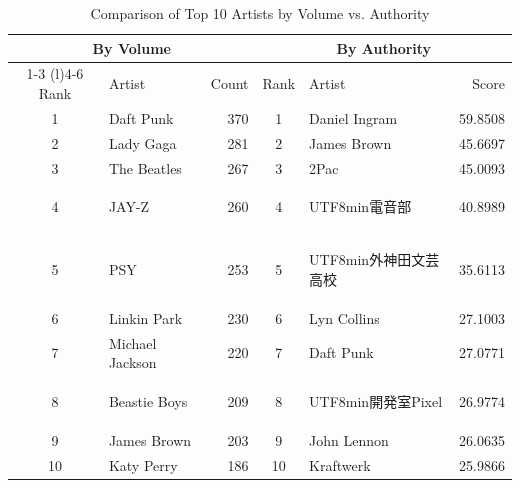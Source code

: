 \begin{table}[h]
\centering
\caption{Comparison of Top 10 Artists by Volume vs. Authority}
\label{tab:top10comparison}
\begin{tabular}{clrclr}
\toprule
\multicolumn{3}{c}{\textbf{By Volume}} & \multicolumn{3}{c}{\textbf{By Authority}} \\
\cmidrule(r){1-3} \cmidrule(l){4-6}
Rank & Artist & Count & Rank & Artist & Score \\
\midrule
1 & Daft Punk & 370 & 1 & Daniel Ingram & 59.8508 \\
2 & Lady Gaga & 281 & 2 & James Brown & 45.6697 \\
3 & The Beatles & 267 & 3 & 2Pac & 45.0093 \\
4 & JAY-Z & 260 & 4 & \begin{CJK*}{UTF8}{min}電音部\end{CJK*} & 40.8989 \\
5 & PSY & 253 & 5 & \begin{CJK*}{UTF8}{min}外神田文芸高校\end{CJK*} & 35.6113 \\
6 & Linkin Park & 230 & 6 & Lyn Collins & 27.1003 \\
7 & Michael Jackson & 220 & 7 & Daft Punk & 27.0771 \\
8 & Beastie Boys & 209 & 8 & \begin{CJK*}{UTF8}{min}開発室Pixel\end{CJK*} & 26.9774 \\
9 & James Brown & 203 & 9 & John Lennon & 26.0635 \\
10 & Katy Perry & 186 & 10 & Kraftwerk & 25.9866 \\
\bottomrule
\end{tabular}
\end{table}
